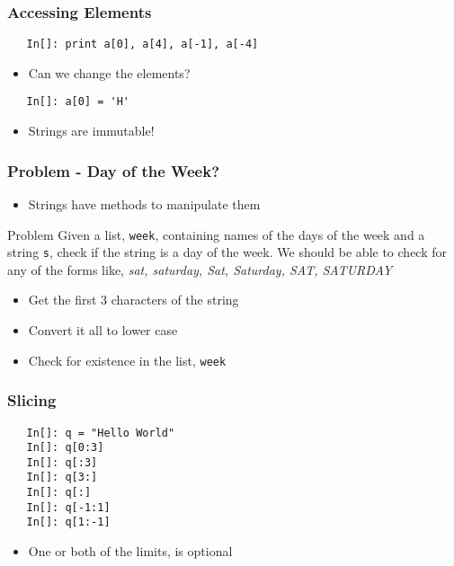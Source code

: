 \begin{frame}[fragile]
  \frametitle{Accessing Elements}
  \begin{lstlisting}
   In[]: print a[0], a[4], a[-1], a[-4]
  \end{lstlisting}
  \begin{itemize}
  \item Can we change the elements?
  \end{itemize}
  \begin{lstlisting}
   In[]: a[0] = 'H'
  \end{lstlisting}
  \begin{itemize}
  \item Strings are immutable!
  \end{itemize}
\end{frame}

\begin{frame}[fragile]
  \frametitle{Problem - Day of the Week?}
  \begin{itemize}
  \item Strings have methods to manipulate them
  \end{itemize}
  \begin{block}{Problem}
    Given a list, \texttt{week}, containing names of the days of the
    week and a string \texttt{s}, check if the string is a day of the
    week. We should be able to check for any of the forms like,
    \emph{sat, saturday, Sat, Saturday, SAT, SATURDAY}
  \end{block}
  \begin{itemize}
  \item Get the first 3 characters of the string
  \item Convert it all to lower case
  \item Check for existence in the list, \texttt{week}
  \end{itemize}
\end{frame}

\begin{frame}[fragile]
  \frametitle{Slicing}
  \begin{lstlisting}
   In[]: q = "Hello World"
   In[]: q[0:3]
   In[]: q[:3]
   In[]: q[3:]
   In[]: q[:]
   In[]: q[-1:1]
   In[]: q[1:-1]
  \end{lstlisting}
  \begin{itemize}
  \item One or both of the limits, is optional
  \end{itemize}
\end{frame}

